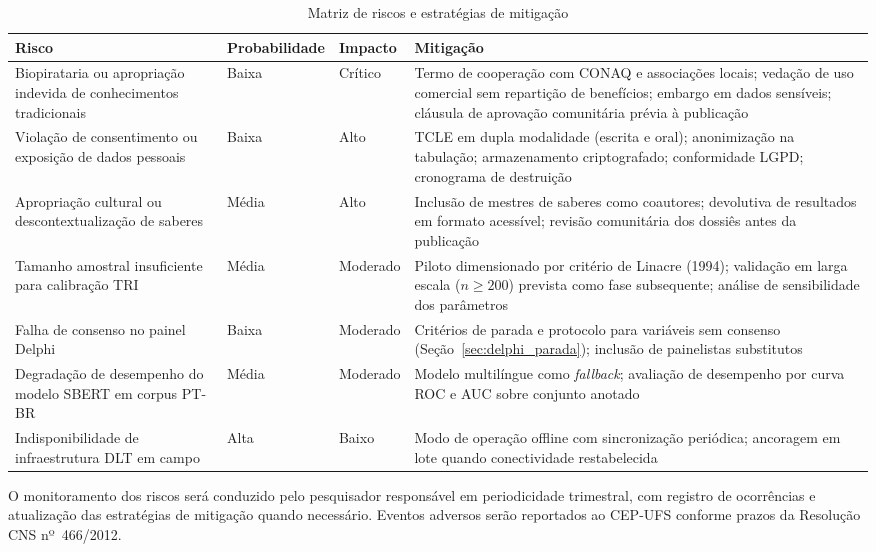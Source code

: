 \begin{table}[H]
\centering
\caption{Matriz de riscos e estratégias de mitigação}\label{tab:riscos}
\footnotesize
\begin{tabular}{@{}p{3.5cm}p{2cm}p{2cm}p{6cm}@{}}
\toprule
\textbf{Risco} & \textbf{Probabilidade} & \textbf{Impacto} & \textbf{Mitigação} \\
\midrule
Biopirataria ou apropriação indevida de conhecimentos tradicionais & Baixa & Crítico & Termo de cooperação com CONAQ e associações locais; vedação de uso comercial sem repartição de benefícios; embargo em dados sensíveis; cláusula de aprovação comunitária prévia à publicação \\
\addlinespace
Violação de consentimento ou exposição de dados pessoais & Baixa & Alto & TCLE em dupla modalidade (escrita e oral); anonimização na tabulação; armazenamento criptografado; conformidade LGPD; cronograma de destruição \\
\addlinespace
Apropriação cultural ou descontextualização de saberes & Média & Alto & Inclusão de mestres de saberes como coautores; devolutiva de resultados em formato acessível; revisão comunitária dos dossiês antes da publicação \\
\addlinespace
Tamanho amostral insuficiente para calibração TRI & Média & Moderado & Piloto dimensionado por critério de Linacre (1994); validação em larga escala ($n \geq 200$) prevista como fase subsequente; análise de sensibilidade dos parâmetros \\
\addlinespace
Falha de consenso no painel Delphi & Baixa & Moderado & Critérios de parada e protocolo para variáveis sem consenso (Seção~\ref{sec:delphi_parada}); inclusão de painelistas substitutos \\
\addlinespace
Degradação de desempenho do modelo SBERT em corpus PT-BR & Média & Moderado & Modelo multilíngue como \textit{fallback}; avaliação de desempenho por curva ROC e AUC sobre conjunto anotado \\
\addlinespace
Indisponibilidade de infraestrutura DLT em campo & Alta & Baixo & Modo de operação offline com sincronização periódica; ancoragem em lote quando conectividade restabelecida \\
\bottomrule
\end{tabular}
\end{table}

O monitoramento dos riscos será conduzido pelo pesquisador responsável em periodicidade trimestral, com registro de ocorrências e atualização das estratégias de mitigação quando necessário. Eventos adversos serão reportados ao CEP-UFS conforme prazos da Resolução CNS nº~466/2012.


